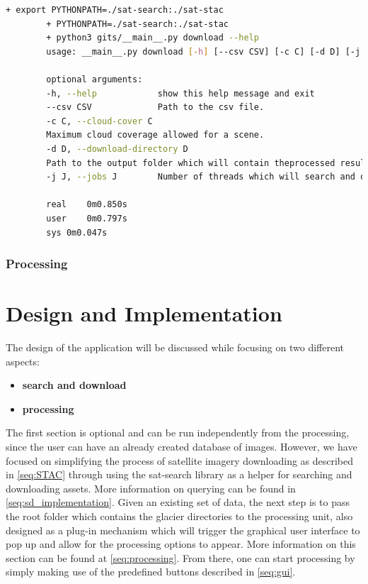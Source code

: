 \documentclass[12pt, a4paper]{report}
\begin{document}
	\begin{lstlisting}[caption={Detailed parameters required for the download script.},label={lst:downloadhelp},language=Bash]
		+ export PYTHONPATH=./sat-search:./sat-stac
		+ PYTHONPATH=./sat-search:./sat-stac
		+ python3 gits/__main__.py download --help
		usage: __main__.py download [-h] [--csv CSV] [-c C] [-d D] [-j J]
		
		optional arguments:
		-h, --help            show this help message and exit
		--csv CSV             Path to the csv file.
		-c C, --cloud-cover C
		Maximum cloud coverage allowed for a scene.
		-d D, --download-directory D
		Path to the output folder which will contain theprocessed results.
		-j J, --jobs J        Number of threads which will search and download.
		
		real	0m0.850s
		user	0m0.797s
		sys	0m0.047s
	\end{lstlisting}
	
	\subsection{Processing}
	\label{ssubsec:processing_gui}

	\newpage{}
	\chapter{Design and Implementation}
	\label{cha:design_and_implementation}
	
	\par The design of the application will be discussed while focusing on two different aspects:
	
	\begin{itemize}
		\item \textbf{search and download}
		\item \textbf{processing}
	\end{itemize}

	\par The first section is optional and can be run independently from the processing, since the user can have an already created database of images. However, we have focused on simplifying the process of satellite imagery downloading as described in \ref{seq:STAC} through using the sat-search library as a helper for searching and downloading assets. More information on querying can be found in \ref{seq:sd_implementation}. 
	Given an existing set of data, the next step is to pass the root folder which contains the glacier directories to the processing unit, also designed as a plug-in mechanism which will trigger the graphical user interface to pop up and allow for the processing options to appear. More information on this section can be found at \ref{seq:processing}. From there, one can start processing by simply making use of the predefined buttons described in \ref{seq:gui}.
	
\end{document}
